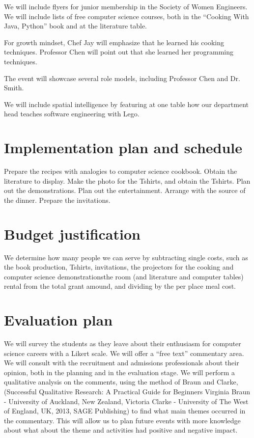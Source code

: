 \documentclass[]{article}
\begin{document}
	We will include flyers for junior membership in the Society of Women Engineers. We will include lists of free computer science 
	courses, both in the ``Cooking With Java, Python'' book and at the literature table.
	
	For growth mindset, Chef Jay will emphasize that he learned his cooking techniques. Professor Chen will point out that she learned 
	her programming techniques.
	
	The event will showcase several role models, including Professor Chen and Dr. Smith.
	
	We will include spatial intelligence by featuring at one table how our department head teaches software engineering with 
	Lego.%
	
	
	\section{Implementation plan and schedule}
	Prepare the recipes with analogies to computer science cookbook.
	Obtain the literature to display.
	Make the photo for the Tshirts, and obtain the Tshirts.
	Plan out the demonstrations.
	Plan out the entertainment.
	Arrange with the source of the dinner.
	Prepare the invitations.
	
	\section{Budget justification}
	We determine how many people we can serve by subtracting single costs, such as the book production, Tshirts, invitations, the
	projectors for the cooking and computer science demonstrationsthe room (and literature and computer tables) rental from the 
	total grant amound, and dividing by the per place meal cost.
	
	\section{Evaluation plan}
	We will survey the students as they leave about their enthusiasm for computer science careers with a Likert scale.
	We will offer a ``free text'' commentary area.
	We will consult with the recruitment and admissions professionals about their opinion, both in the planning and in the evaluation stage.
	We will perform a qualitative analysis on the comments, using the method of Braun and Clarke,(Successful Qualitative Research: 
	A Practical Guide for Beginners
	Virginia Braun - University of Auckland, New Zealand, Victoria Clarke - University of The West of England, UK, 2013, SAGE 
	Publishing) to find what main themes occurred in the commentary. This will allow us to plan future events with more knowledge 
	about what about the theme and activities had positive and negative impact.%
	
\end{document}
